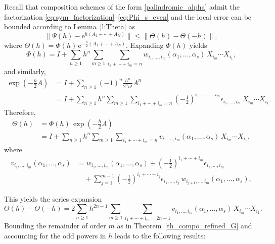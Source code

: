\documentclass[11pt]{article}
\newcommand{\e}{\ensuremath{\mathrm{e}}}
\begin{document}
Recall that composition schemes of the form \eqref{palindromic_alpha} admit the factorization \eqref{eq:sym_factorization}--\eqref{eq:Phi_s_even} and the local error can be bounded according to Lemma~\ref{l:Theta} as
\[
\| \Psi(h) - \mathrm{e}^{h (A_1 + \cdots + A_N)} \| \leq \|\Theta(h)-\Theta(-h)\|,
\]
where $\Theta(h)=\Phi(h) \, \e^{-\frac{h}{2} (A_1 + \cdots + A_N)}$. Expanding $\Phi(h)$ yields
\[
\Phi(h) = I + \sum_{n \geq 1} h^n \sum_{m \geq 1} \sum_{i_1 + \cdots + i_m = n} w_{i_1, \ldots, i_m}(\alpha_1, \ldots, \alpha_s) \, X_{i_m} \cdots X_{i_1},
\]
and similarly,
\begin{align*}
\exp\left(-\tfrac{h}{2} A\right) &= I + \sum_{n \geq 1} (-1)^n \frac{h^n}{2^n n!} A^n \\
&= I + \sum_{n \geq 1} h^n \sum_{m \geq 1} \sum_{i_1 + \cdots + i_m = n} \left(-\tfrac{1}{2}\right)^{i_1 + \cdots + i_m} \epsilon_{i_1, \ldots, i_m} \, X_{i_m} \cdots X_{i_1}.
\end{align*}
Therefore,
\begin{align*}
\Theta(h) &= \Phi(h)\, \exp\left(-\tfrac{h}{2} A\right) \\
&= I + \sum_{n \geq 1} h^n \sum_{m \geq 1} \sum_{i_1 + \cdots + i_m = n} v_{i_1, \ldots, i_m}(\alpha_1, \ldots, \alpha_s) \, X_{i_m} \cdots X_{i_1},
\end{align*}
where
\begin{align*}
v_{i_1, \ldots, i_m}(\alpha_1, \ldots, \alpha_s) &= w_{i_1, \ldots, i_m}(\alpha_1, \ldots, \alpha_s) + \left(-\tfrac{1}{2}\right)^{i_1 + \cdots + i_m} \epsilon_{i_1, \ldots, i_m} \\
&\quad + \sum_{j=1}^{m-1} \left(-\tfrac{1}{2}\right)^{i_{1} + \cdots + i_j}\epsilon_{i_1, \ldots, i_j}  \, w_{i_{j+1}, \ldots, i_m}(\alpha_1, \ldots, \alpha_s),
\end{align*}

This yields the series expansion
\[
\Theta(h) - \Theta(-h) = 2 \sum_{n \geq 1} h^{2n-1} \sum_{m \geq 1} \sum_{i_1 + \cdots + i_m = 2n-1} v_{i_1, \ldots, i_m}(\alpha_1, \ldots, \alpha_s)\, X_{i_m} \cdots X_{i_1}.
\]
Bounding the remainder of order $m$ as in Theorem~\ref{th_compo_refined_G} and accounting for the odd powers in $h$ leads to the following results:
\end{document}

